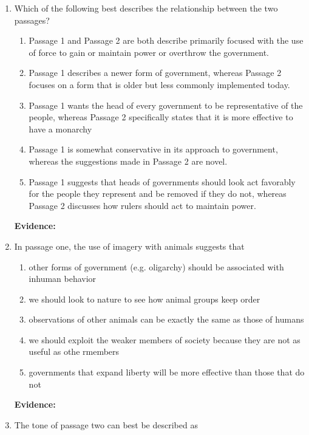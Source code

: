\bigskip
\begin{enumerate}

\item Which of the following best describes the relationship between the two passages?

\bigskip
\begin{enumerate}[label=(\Alph*)]
\item Passage 1 and Passage 2 are both describe primarily focused with the use of force to gain or maintain power or overthrow the government. 
\item Passage 1 describes a newer form of government, whereas Passage 2 focuses on a form that is older but less commonly implemented today. 
\item Passage 1 wants the head of every government to be representative of the people, whereas Passage 2 specifically states that it is more effective to have a monarchy
\item Passage 1 is somewhat conservative in its approach to government, whereas the suggestions made in Passage 2 are novel. 
\item Passage 1 suggests that heads of governments should look act favorably for the people they represent and be removed if they do not, whereas Passage 2 discusses how rulers should act to maintain power. 
\end{enumerate}

\bigskip
\textbf{Evidence:} \hrulefill

\bigskip
\item In passage one, the use of imagery with animals suggests that 

\bigskip
\begin{enumerate}[label=(\Alph*)]
\item other forms of government (e.g. oligarchy) should be associated with inhuman behavior
\item we should look to nature to see how animal groups keep order
\item observations of other animals can be exactly the same as those of humans
\item we should exploit the weaker members of society because they are not as useful as othe rmembers
\item governments that expand liberty will be more effective than those that do not
\end{enumerate}

\bigskip
\textbf{Evidence:} \hrulefill

\bigskip
\item The tone of passage two can best be described as


\end{enumerate}
